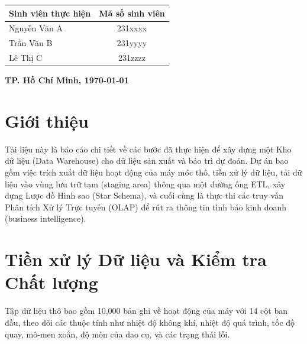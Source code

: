\documentclass[11pt,a4paper]{article}
\begin{document}
\begin{titlepage}
\begin{center}
    \vspace{1cm}
    
    \begin{table}[h]
        \centering
        \large
        \renewcommand{\arraystretch}{1.4}
        \begin{tabular}{|l|c|}
            \hline
            \multicolumn{1}{|c|}{\textbf{Sinh viên thực hiện}} & \textbf{Mã số sinh viên} \\
            \hline
            Nguyễn Văn A & 231xxxx \\
            \hline
            Trần Văn B & 231yyyy \\
            \hline
            Lê Thị C & 231zzzz \\
            \hline
        \end{tabular}
    \end{table}

    \vfill
    \textbf{TP. Hồ Chí Minh, \today}
\end{center}

\end{titlepage}

\maketitle
\tableofcontents
\newpage

\section{Giới thiệu}
Tài liệu này là báo cáo chi tiết về các bước đã thực hiện để xây dựng một Kho dữ liệu (Data Warehouse) cho dữ liệu sản xuất và bảo trì dự đoán. Dự án bao gồm việc trích xuất dữ liệu hoạt động của máy móc thô, tiền xử lý dữ liệu, tải dữ liệu vào vùng lưu trữ tạm (staging area) thông qua một đường ống ETL, xây dựng Lược đồ Hình sao (Star Schema), và cuối cùng là thực thi các truy vấn Phân tích Xử lý Trực tuyến (OLAP) để rút ra thông tin tình báo kinh doanh (business intelligence).

\section{Tiền xử lý Dữ liệu và Kiểm tra Chất lượng}
Tập dữ liệu thô bao gồm 10,000 bản ghi về hoạt động của máy với 14 cột ban đầu, theo dõi các thuộc tính như nhiệt độ không khí, nhiệt độ quá trình, tốc độ quay, mô-men xoắn, độ mòn của dao cụ, và các trạng thái lỗi.
\end{document}
